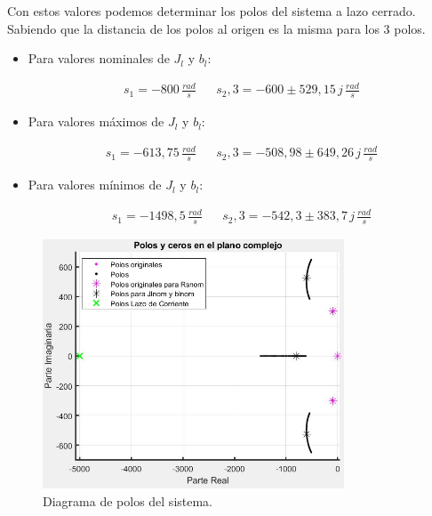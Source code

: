 \documentclass{article}
\begin{document}
Con estos valores podemos determinar los polos del sistema a lazo cerrado. Sabiendo que la distancia
de los polos al origen es la misma para los 3 polos.

\begin{itemize}
    \item Para valores nominales de $J_l$ y $b_l$:
    
    \begin{align*}
        s_1 = -800\, \frac{rad}{s} & & s_2,3  = -600 \pm 529,15\, j \, \frac{rad}{s} 
    \end{align*}
    
    \item Para valores máximos de $J_l$ y $b_l$:
    
    \begin{align*}
        s_1 = -613,75\, \frac{rad}{s} & & s_2,3  = -508,98 \pm 649,26\, j \, \frac{rad}{s} 
    \end{align*}

    \item Para valores mínimos de $J_l$ y $b_l$:
    
    \begin{align*}
        s_1 = -1498,5\, \frac{rad}{s} & & s_2,3  = -542,3 \pm 383,7\, j \, \frac{rad}{s} 
    \end{align*}

\end{itemize}

\begin{figure}[H]
    \centering
    \includegraphics[width=0.8\textwidth]{polos.jpg}
    \caption{Diagrama de polos del sistema.}
\end{figure}
\end{document}

